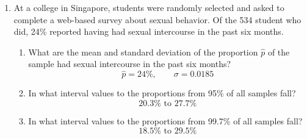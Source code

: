 \begin{enumerate}
\clearpage

\item At a college in Singapore, students were randomly selected and asked to complete a web-based survey about sexual behavior. Of the 534 student who did, 24\% reported having had sexual intercourse in the past six months.
\begin{enumerate}
	\item What are the mean and standard deviation of the proportion $\hat{p}$ of the sample had sexual intercourse in the past six months? 
	\ifsolns
	\[ \hat{p}=24\%,\qquad \sigma = 0.0185\]
	\fi
	\vfill
	\item In what interval values to the proportions from 95\% of all samples fall? 	\ifsolns
	\[ 20.3\% \text{ to } 27.7\%\]
	\fi
\vfill
	\item In what interval values to the proportions from 99.7\% of all samples fall? 	\ifsolns
	\[ 18.5\% \text{ to } 29.5\%\]
	\fi
\vfill
\end{enumerate}


\end{enumerate}
